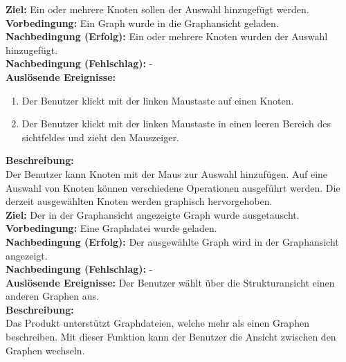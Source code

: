 \label{fa:selekt_knoten}
\textbf{Ziel:} Ein oder mehrere Knoten sollen der Auswahl hinzugefügt werden.\\
\textbf{Vorbedingung:} Ein Graph wurde in die Graphansicht geladen.\\
\textbf{Nachbedingung (Erfolg):} Ein oder mehrere Knoten wurden der Auswahl hinzugefügt.\\
\textbf{Nachbedingung (Fehlschlag):} -\\
\textbf{Auslösende Ereignisse:}
\begin{enumerate}[nolistsep, label=(\alph*)]
  \item Der Benutzer klickt mit der linken Maustaste auf einen Knoten.
  \item Der Benutzer klickt mit der linken Maustaste in einen leeren Bereich des \gls{sichtfeld}es und zieht den Mauszeiger.
\end{enumerate}
\textbf{Beschreibung:}\\
Der Benutzer kann Knoten mit der Maus zur Auswahl hinzufügen.
Auf eine Auswahl von Knoten können verschiedene Operationen ausgeführt werden. %
Die derzeit ausgewählten Knoten werden graphisch hervorgehoben.\\

\label{fa:graphwechsel}
\textbf{Ziel:} Der in der Graphansicht angezeigte Graph wurde ausgetauscht. \\
\textbf{Vorbedingung:} Eine Graphdatei wurde geladen.\\
\textbf{Nachbedingung (Erfolg):} Der ausgewählte Graph wird in der Graphansicht angezeigt.\\
\textbf{Nachbedingung (Fehlschlag):} -\\
\textbf{Auslösende Ereignisse:}
Der Benutzer wählt über die Strukturansicht einen anderen Graphen aus.\\
\textbf{Beschreibung:}\\
Das Produkt unterstützt Graphdateien, welche mehr als einen Graphen beschreiben.
Mit dieser Funktion kann der Benutzer die Ansicht zwischen den Graphen wechseln.

